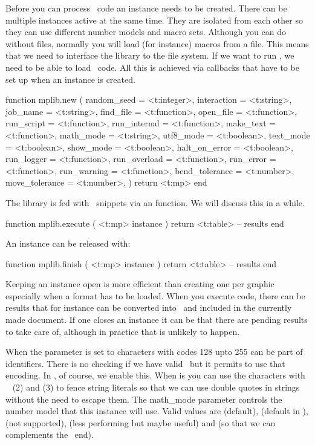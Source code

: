 Before you can process \METAPOST\ code an instance needs to be created. There can
be multiple instances active at the same time. They are isolated from each other
so they can use different number models and macro sets. Although you can do
without files, normally you will load (for instance) macros from a file. This
means that we need to interface the library to the file system. If we want to run
\LUA, we need to be able to load \LUA\ code. All this is achieved via callbacks
that have to be set up when an instance is created.

\starttyping[option=LUA]
function mplib.new (
    {
        random_seed    = <t:integer>,
        interaction    = <t:string>,
        job_name       = <t:string>,
        find_file      = <t:function>,
        open_file      = <t:function>,
        run_script     = <t:function>,
        run_internal   = <t:function>,
        make_text      = <t:function>,
        math_mode      = <t:string>,
        utf8_mode      = <t:boolean>,
        text_mode      = <t:boolean>,
        show_mode      = <t:boolean>,
        halt_on_error  = <t:boolean>,
        run_logger     = <t:function>,
        run_overload   = <t:function>,
        run_error      = <t:function>,
        run_warning    = <t:function>,
        bend_tolerance = <t:number>,
        move_tolerance = <t:number>,
    }
)
    return <t:mp>
end
\stoptyping

The library is fed with \METAPOST\ snippets via an  function. We
will discuss this in a while.

\starttyping[option=LUA]
function mplib.execute ( <t:mp> instance )
    return <t:table> -- results
end
\stoptyping

An instance can be released with:

\starttyping[option=LUA]
function mplib.finish ( <t:mp> instance )
    return <t:table> -- results
end
\stoptyping

Keeping an instance open is more efficient than creating one per graphic
especially when a format has to be loaded. When you execute code, there can be
results that for instance can be converted into \PDF\ and included in the
currently made document. If one closes an instance it can be that there are
pending results to take care of, although in practice that is unlikely to happen.

When the  parameter is set to  characters with codes
128 upto 255 can be part of identifiers. There is no checking if we have valid
\UTF\ but it permits to use that encoding. In \CONTEXT, of course, we enable
this. When  is  you can use the characters with
\ASCII\  (2) and  (3) to fence string literals so that we
can use double quotes in strings without the need to escape them. The \type
{math_mode} parameter controls the number model that this instance will use.
Valid values are  (default),  (default in \CONTEXT),
 (not supported),  (less performing but maybe
useful) and  (so that we can complements the \TEX\ end).

